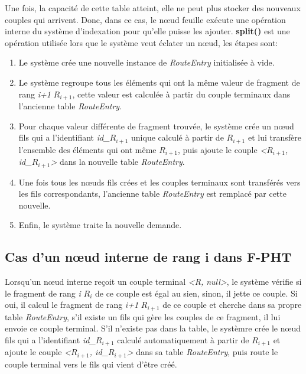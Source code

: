\documentclass[a4paper,11pt]{report}
\begin{document}
	Une fois, la capacité de cette table atteint, elle ne peut plus stocker des nouveaux couples qui arrivent. Donc, dans ce cas, le nœud feuille exécute une opération interne du système d'indexation pour qu'elle puisse les ajouter. \textbf{split()} est une opération utilisée lors que le système veut éclater un nœud, les étapes sont:
	\begin{enumerate}
		\item Le système crée une nouvelle instance de \textit{RouteEntry} initialisée à vide.
		\item Le système regroupe tous les éléments qui ont la même valeur de fragment de rang \textit{i+1} \textit{$R_{i+1}$}, cette valeur est calculée à partir du couple terminaux dans l'ancienne table \textit{RouteEntry}.
		\item Pour chaque valeur différente de fragment trouvée, le système crée un nœud fils qui a l'identifiant \textit{id\_$R_{i+1}$} unique calculé à partir de \textit{$R_{i+1}$} et lui transfère l'ensemble des éléments qui ont même \textit{$R_{i+1}$}, puis ajoute le couple \textit{<$R_{i+1}$, id\_$R_{i+1}$>} dans la nouvelle table \textit{RouteEntry}.
		\item Une fois tous les nœuds fils crées et les couples terminaux sont transférés vers les fils correspondants, l'ancienne table \textit{RouteEntry} est remplacé par cette nouvelle.
		\item Enfin, le système traite la nouvelle demande.
	\end{enumerate}
	
\subsection{Cas d'un nœud interne de rang i dans F-PHT}
	Lorsqu'un nœud interne reçoit un couple terminal \textit{<R, null>}, le système vérifie si le fragment de rang \textit{i} \textit{$R_{i}$} de ce couple est égal au sien, sinon, il jette ce couple. Si oui, il calcul le fragment de rang \textit{i+1} \textit{$R_{i+1}$} de ce couple et cherche dans sa propre table \textit{RouteEntry}, s'il existe un fils qui gère les couples de ce fragment, il lui envoie ce couple terminal. S'il n'existe pas dans la table, le systèmre crée le nœud fils qui a l'identifiant \textit{id\_$R_{i+1}$} calculé automatiquement à partir de \textit{$R_{i+1}$} et ajoute le couple \textit{<\textit{$R_{i+1}$}, \textit{id\_$R_{i+1}$}>} dans sa table \textit{RouteEntry}, puis route le couple terminal vers  le fils qui vient d'être créé.
	
\end{document}

